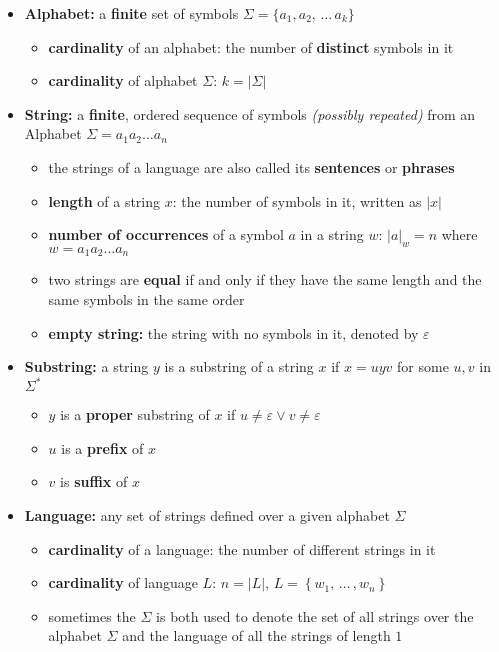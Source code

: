 \documentclass[english]{article}
\begin{document}
\begin{itemize}
  \item \textbf{Alphabet:} a \textbf{finite} set of symbols \(\Sigma = \{a_1, a_2, \,\ldots\, a_k\}\)
        \begin{itemize}
          \item \textbf{cardinality} of an alphabet: the number of \textbf{distinct} symbols in it
          \item \textbf{cardinality} of alphabet \(\Sigma\): \(k = \left|\Sigma\right|\)
        \end{itemize}
  \item \textbf{String:} a \textbf{finite}, ordered sequence of symbols \textit{(possibly repeated)} from an Alphabet \(\Sigma = a_1a_2\ldots a_n\)
        \begin{itemize}
          \item the strings of a language are also called its \textbf{sentences} or \textbf{phrases}
          \item \textbf{length} of a string \(x\): the number of symbols in it, written as \(|x|\)
          \item \textbf{number of occurrences} of a symbol \(a\) in a string \(w\): \(\left|a\right|_w = n\) where \(w = a_1a_2\ldots a_n\)
          \item two strings are \textbf{equal} if and only if they have the same length and the same symbols in the same order
          \item \textbf{empty string:} the string with no symbols in it, denoted by \(\varepsilon\)
        \end{itemize}
  \item \textbf{Substring:} a string \(y\) is a substring of a string \(x\) if \(x = uyv\) for some \(u, v\) in \(\Sigma^\ast\)
        \begin{itemize}
          \item \(y\) is a \textbf{proper} substring of \(x\) if \(u \neq \varepsilon \lor v \neq \varepsilon\)
          \item \(u\) is a \textbf{prefix} of \(x\)
          \item \(v\) is \textbf{suffix} of \(x\)
        \end{itemize}
  \item \textbf{Language:} any set of strings defined over a given alphabet \(\Sigma\)
        \begin{itemize}
          \item \textbf{cardinality} of a language: the number of different strings in it
          \item \textbf{cardinality} of language \(L\): \(n = \left| L \right|\), \(L =  \left\{ w_1, \,\ldots\, , w_n \right\}\)
          \item sometimes the \(\Sigma\) is both used to denote the set of all strings over the alphabet \(\Sigma\) and the language of all the strings of length \(1\)
        \end{itemize}
\end{itemize}
\end{document}
